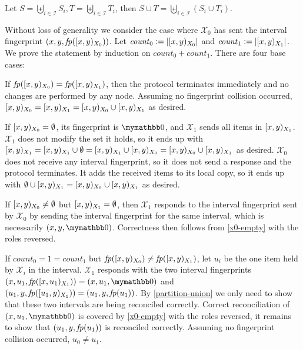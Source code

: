 \begin{proposition}
\label{partition-union}
Let $S = \biguplus_{i \in \mathcal{I}} S_i, T = \biguplus_{i \in \mathcal{I}} T_i$, then $S \cup T = \biguplus_{i \in \mathcal{I}} (S_i \cup T_i)$.
\end{proposition}

\newcommand{\intcount}[1]{\mathit{count}_{#1}}

Without loss of generality we consider the case where $\mathcal{X}_0$ has sent the interval fingerprint $({x}, {y}, {\mathit{fp}([{x},{y})_{X_0})})$. Let $\intcount{0} \defeq \abs{\interval{x}{y}{X_0}}$ and $\intcount{1} \defeq \abs{\interval{x}{y}{X_1}}$.
We prove the statement by induction on $\intcount{0} + \intcount{1}$. There are four base cases:

\begin{caselist}
 \label{fingerprint-eq} If $\mathit{fp}([{x},{y})_{X_0}) = \mathit{fp}([{x},{y})_{X_1})$, then the protocol terminates immediately and no changes are performed by any node. Assuming no fingerprint collision occurred, $[{x},{y})_{X_0} = [{x},{y})_{X_1} = [{x},{y})_{X_0} \cup [{x},{y})_{X_1}$ as desired.

 \label{x0-empty} If $[{x},{y})_{X_0} = \emptyset$, its fingerprint is $\neutraladd$, and $\mathcal{X}_1$ sends all items in $[{x},{y})_{X_1}$. $\mathcal{X}_1$ does not modify the set it holds, so it ends up with $[{x},{y})_{X_1} = [{x},{y})_{X_1} \cup \emptyset = [{x},{y})_{X_1} \cup [{x},{y})_{X_0} = [{x},{y})_{X_0} \cup [{x},{y})_{X_1}$ as desired. $\mathcal{X}_0$ does not receive any interval fingerprint, so it does not send a response and the protocol terminates. It adds the received items to its local copy, so it ends up with $\emptyset \cup [{x},{y})_{X_1} = [{x},{y})_{X_0} \cup [{x},{y})_{X_1}$ as desired.

 \label{x1-empty} If $[{x},{y})_{X_0} \neq \emptyset$ but $[{x},{y})_{X_1} = \emptyset$, then $\mathcal{X}_1$ responds to the interval fingerprint sent by $\mathcal{X}_0$ by sending the interval fingerprint for the same interval, which is necessarily $\ifpmanual{x}{y}{\neutraladd}$. Correctness then follows from \cref{x0-empty} with the roles reversed.

 \label{two-singletons} If $\intcount{0} = 1 = \intcount{1}$ but $\mathit{fp}([{x},{y})_{X_0}) \neq \mathit{fp}([{x},{y})_{X_1})$, let $u_i$ be the one item held by $\mathcal{X}_i$ in the interval. $\mathcal{X}_1$ responds with the two interval fingerprints $\ifp{x}{u_1}{X_1} = \ifpmanual{x}{u_1}{\neutraladd}$ and $({u_1}, {y}, {\mathit{fp}([{u_1},{y})_{X_1})}) = ({u_1}, {y}, {\mathit{fp}(u_1)})$. By \cref{partition-union} we only need to show that these two intervals are being reconciled correctly. Correct reconciliation of $\ifpmanual{x}{u_1}{\neutraladd}$ is covered by \cref{x0-empty} with the roles reversed, it remains to show that $({u_1}, {y}, {\mathit{fp}(u_1)})$ is reconciled correctly. Assuming no fingerprint collision occurred, $u_0 \neq u_1$.


\end{caselist}
